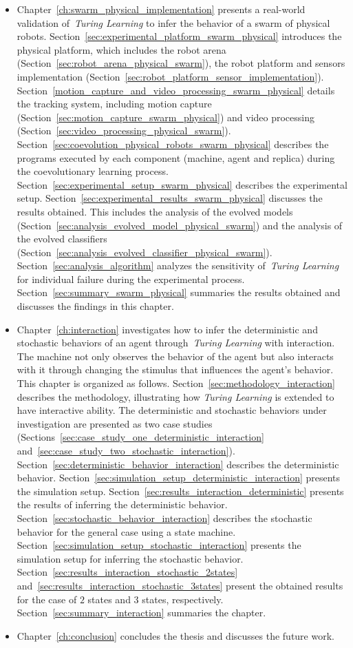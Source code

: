 \begin{itemize}
\item Chapter~\ref{ch:swarm_physical_implementation} presents a real-world validation of~\textit{Turing Learning} to infer the behavior of a swarm of physical robots. Section~\ref{sec:experimental_platform_swarm_physical} introduces the physical platform, which includes the robot arena (Section~\ref{sec:robot_arena_physical_swarm}), the robot platform and sensors implementation (Section~\ref{sec:robot_platform_sensor_implementation}). Section~\ref{motion_capture_and_video_processing_swarm_physical} details the tracking system, including motion capture (Section~\ref{sec:motion_capture_swarm_physical}) and video processing (Section~\ref{sec:video_processing_physical_swarm}). Section~\ref{sec:coevolution_physical_robots_swarm_physical} describes the programs executed by each component (machine, agent and replica) during the coevolutionary learning process. Section~\ref{sec:experimental_setup_swarm_physical} describes the experimental setup. Section~\ref{sec:experimental_results_swarm_physical} discusses the results obtained. This includes the analysis of the evolved models (Section~\ref{sec:analysis_evolved_model_physical_swarm}) and the analysis of the evolved classifiers (Section~\ref{sec:analysis_evolved_classifier_physical_swarm}). Section~\ref{sec:analysis_algorithm} analyzes the sensitivity of~\textit{Turing Learning} for individual failure during the experimental process. Section~\ref{sec:summary_swarm_physical} summaries the results obtained and discusses the findings in this chapter.

\item Chapter~\ref{ch:interaction} investigates how to infer the deterministic and stochastic behaviors of an agent through~\textit{Turing Learning} with interaction. The machine not only observes the behavior of the agent but also interacts with it through changing the stimulus that influences the agent's behavior. This chapter is organized as follows. Section~\ref{sec:methodology_interaction} describes the methodology, illustrating how \textit{Turing Learning} is extended to have interactive ability. The deterministic and stochastic behaviors under investigation are presented as two case studies (Sections~\ref{sec:case_study_one_deterministic_interaction} and~\ref{sec:case_study_two_stochastic_interaction}). Section~\ref{sec:deterministic_behavior_interaction} describes the deterministic behavior. Section~\ref{sec:simulation_setup_deterministic_interaction} presents the simulation setup. Section~\ref{sec:results_interaction_deterministic} presents the results of inferring the deterministic behavior. Section~\ref{sec:stochastic_behavior_interaction} describes the stochastic behavior for the general case using a state machine. Section~\ref{sec:simulation_setup_stochastic_interaction} presents the simulation setup for inferring the stochastic behavior. Section~\ref{sec:results_interaction_stochastic_2states} and~\ref{sec:results_interaction_stochastic_3states} present the obtained results for the case of $2$ states and $3$ states, respectively. Section~\ref{sec:summary_interaction} summaries the chapter.

\item Chapter~\ref{ch:conclusion} concludes the thesis and discusses the future work. 

\end{itemize}
